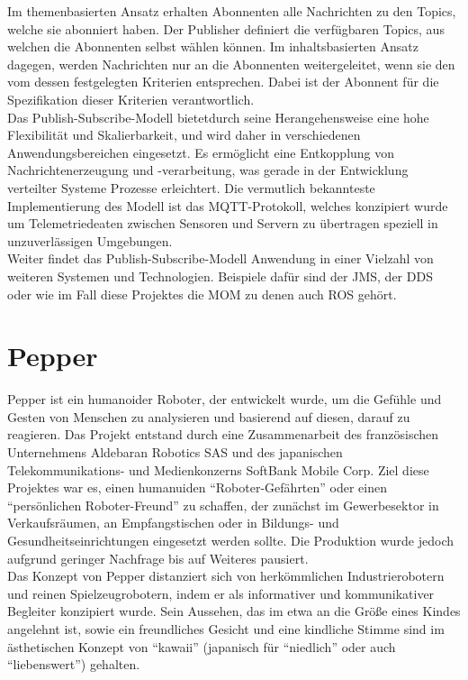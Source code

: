 \noindent
Im themenbasierten Ansatz erhalten Abonnenten alle Nachrichten zu den Topics, welche sie abonniert haben. Der Publisher definiert die verfügbaren Topics, aus welchen die Abonnenten selbst wählen können. Im inhaltsbasierten Ansatz dagegen, werden Nachrichten nur an die Abonnenten weitergeleitet, wenn sie den vom dessen festgelegten Kriterien entsprechen. Dabei ist der Abonnent für die Spezifikation dieser Kriterien verantwortlich\cite{itwissen_publish_subscribe_model}.
\\

\noindent
Das Publish-Subscribe-Modell bietetdurch seine Herangehensweise eine hohe Flexibilität und Skalierbarkeit, und wird daher in verschiedenen Anwendungsbereichen eingesetzt. Es ermöglicht eine Entkopplung von Nachrichtenerzeugung und -verarbeitung, was gerade in der Entwicklung verteilter Systeme Prozesse erleichtert. Die vermutlich bekannteste Implementierung des Modell ist das MQTT-Protokoll, welches konzipiert wurde um Telemetriedeaten zwischen Sensoren und Servern zu übertragen speziell in unzuverlässigen Umgebungen\cite{elektronik_kompendium_publish_subscribe}.
\\

\noindent
Weiter findet das Publish-Subscribe-Modell Anwendung in einer Vielzahl von weiteren Systemen und Technologien. Beispiele dafür sind der \ac{JMS}, der \ac{DDS} oder wie im Fall diese Projektes die \ac{MOM} zu denen auch \ac{ROS} gehört.\\


\section{Pepper}\label{sec:Pepper}
Pepper ist ein humanoider Roboter, der entwickelt wurde, um die Gefühle und Gesten von Menschen zu analysieren und basierend auf diesen, darauf zu reagieren. Das Projekt entstand durch eine Zusammenarbeit des französischen Unternehmens Aldebaran Robotics \ac{SAS} und des japanischen Telekommunikations- und Medienkonzerns SoftBank Mobile Corp. Ziel diese Projektes war es, einen humanuiden ``Roboter-Gefährten'' oder einen ``persönlichen Roboter-Freund'' zu schaffen, der zunächst im Gewerbesektor in Verkaufsräumen, an Empfangstischen oder in Bildungs- und Gesundheitseinrichtungen eingesetzt werden sollte. Die Produktion wurde jedoch aufgrund geringer Nachfrage bis auf Weiteres pausiert.
\\

\noindent
Das Konzept von Pepper distanziert sich von herkömmlichen Industrierobotern und reinen Spielzeugrobotern, indem er als informativer und kommunikativer Begleiter konzipiert wurde. Sein Aussehen, das im etwa an die Größe eines Kindes angelehnt ist, sowie ein freundliches Gesicht und eine kindliche Stimme sind im ästhetischen Konzept von ``kawaii'' (japanisch für ``niedlich'' oder auch ``liebenswert'') gehalten.
\\

